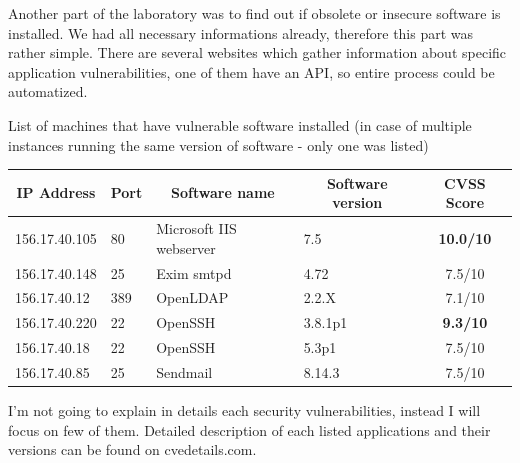 \documentclass[a4paper, 11pt]{article}
\begin{document}
Another part of the laboratory was to find out if obsolete or insecure software is installed.
We had all necessary informations already, therefore this part was rather simple. There are several websites which gather information about specific application vulnerabilities, one of them have an API, so entire process could be automatized.

List of machines that have vulnerable software installed (in case of multiple instances running the same version of software - only one was listed)

\begin{table}[h]
  \centering
\begin{tabular}{|l|l|l|l|c|}
\hline
\multicolumn{1}{|c|}{IP Address} & \multicolumn{1}{c|}{Port} & \multicolumn{1}{c|}{Software name} & \multicolumn{1}{c|}{Software version} & CVSS Score                              \\ \hline
156.17.40.105                    & 80                        & Microsoft IIS webserver            & 7.5                                   & {\color[HTML]{FE0000} \textbf{10.0/10}} \\ \hline
156.17.40.148                    & 25                        & Exim smtpd                         & 4.72                                  & {\color[HTML]{F56B00} 7.5/10}           \\ \hline
156.17.40.12                     & 389                       & OpenLDAP                           & 2.2.X                                 & {\color[HTML]{F56B00} 7.1/10}           \\ \hline
156.17.40.220                    & 22                        & OpenSSH                            & 3.8.1p1                               & {\color[HTML]{FE0000} \textbf{9.3/10}}  \\ \hline
156.17.40.18                     & 22                        & OpenSSH                            & 5.3p1                                 & {\color[HTML]{F56B00} 7.5/10}           \\ \hline
156.17.40.85                     & 25                        & Sendmail                           & 8.14.3                                & {\color[HTML]{F56B00} 7.5/10}           \\ \hline
\end{tabular}
\end{table}


I'm not going to explain in details each security vulnerabilities, instead I will focus on few of them. Detailed description of each listed applications and their versions can be found on cvedetails.com. 
\end{document}
